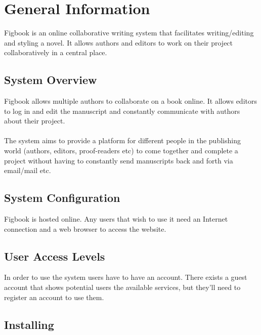 \section{General Information}
\par{Figbook is an online collaborative writing system that facilitates writing/editing and styling a novel. It allows authors and editors to work on their project collaboratively in a central place.}

\subsection{System Overview}
\par{Figbook allows multiple authors to collaborate on a book online. It allows editors to log in and edit the manuscript and constantly communicate with authors about their project. \\ \\The system aims to provide a platform for different people in the publishing world (authors, editors, proof-readers etc) to come together and complete a project without having to constantly send manuscripts back and forth via email/mail etc.}

\subsection{System Configuration}
\par{Figbook is hosted online. Any users that wish to use it need an Internet connection and a web browser to access the website.}

\subsection{User Access Levels}
In order to use the system users have to have an account. There exists a guest account that shows potential users the available services, but they'll need to register an account to use them.

\subsection{Installing}
